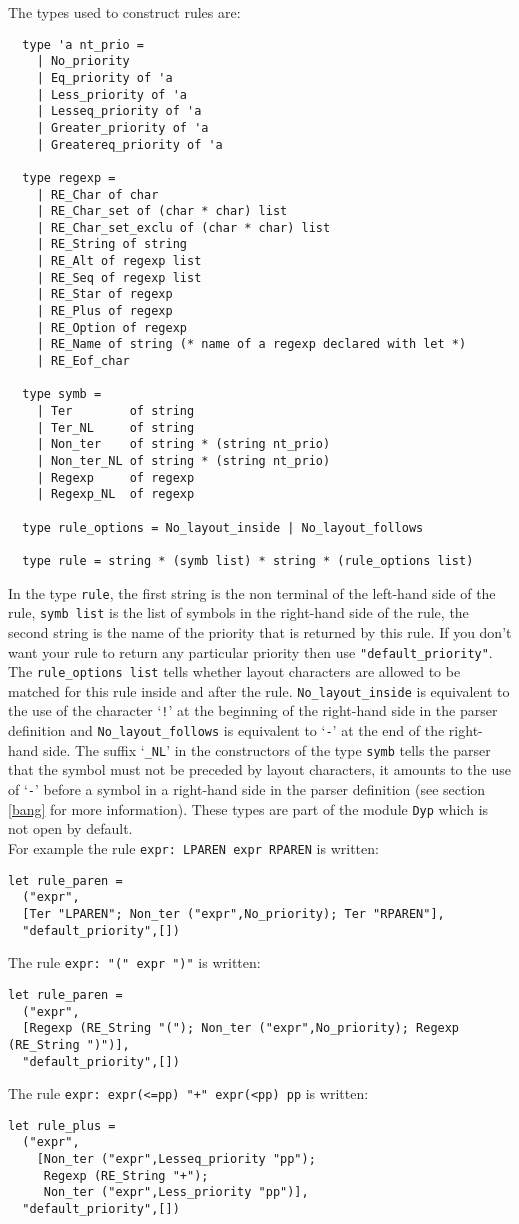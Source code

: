 \documentclass[12pt]{article}
\begin{document}
{The types used to construct rules are:
\begin{verbatim}
  type 'a nt_prio =
    | No_priority
    | Eq_priority of 'a
    | Less_priority of 'a
    | Lesseq_priority of 'a
    | Greater_priority of 'a
    | Greatereq_priority of 'a

  type regexp =
    | RE_Char of char
    | RE_Char_set of (char * char) list
    | RE_Char_set_exclu of (char * char) list
    | RE_String of string
    | RE_Alt of regexp list
    | RE_Seq of regexp list
    | RE_Star of regexp
    | RE_Plus of regexp
    | RE_Option of regexp
    | RE_Name of string (* name of a regexp declared with let *)
    | RE_Eof_char

  type symb =
    | Ter        of string
    | Ter_NL     of string
    | Non_ter    of string * (string nt_prio)
    | Non_ter_NL of string * (string nt_prio)
    | Regexp     of regexp
    | Regexp_NL  of regexp

  type rule_options = No_layout_inside | No_layout_follows

  type rule = string * (symb list) * string * (rule_options list)
\end{verbatim}
In the type \verb|rule|, the first string is the non terminal of the left-hand side of the rule, \verb|symb list| is the list of symbols in the right-hand side of the rule, the second string is the name of the priority that is returned by this rule. If you don't want your rule to return any particular priority then use \verb|"default_priority"|. The \verb|rule_options list| tells whether layout characters are allowed to be matched for this rule inside and after the rule. \verb|No_layout_inside| is equivalent to the use of the character `\verb|!|' at the beginning of the right-hand side in the parser definition and \verb|No_layout_follows| is equivalent to `\verb|-|' at the end of the right-hand side. The suffix `\verb|_NL|' in the constructors of the type \verb|symb| tells the parser that the symbol must not be preceded by layout characters, it amounts to the use of `\verb|-|' before a symbol in a right-hand side in the parser definition (see section \ref{bang} for more information). These types are part of the module \verb|Dyp| which is not open by default.\\

For example the rule \verb|expr: LPAREN expr RPAREN| is written:
\begin{verbatim}
let rule_paren =
  ("expr",
  [Ter "LPAREN"; Non_ter ("expr",No_priority); Ter "RPAREN"],
  "default_priority",[])
\end{verbatim}
The rule \verb|expr: "(" expr ")"| is written:
\begin{verbatim}
let rule_paren =
  ("expr",
  [Regexp (RE_String "("); Non_ter ("expr",No_priority); Regexp (RE_String ")")],
  "default_priority",[])
\end{verbatim}
The rule \verb|expr: expr(<=pp) "+" expr(<pp) pp| is written:
\begin{verbatim}
let rule_plus =
  ("expr",
    [Non_ter ("expr",Lesseq_priority "pp");
     Regexp (RE_String "+");
     Non_ter ("expr",Less_priority "pp")],
  "default_priority",[])
\end{verbatim}

}
\end{document}
